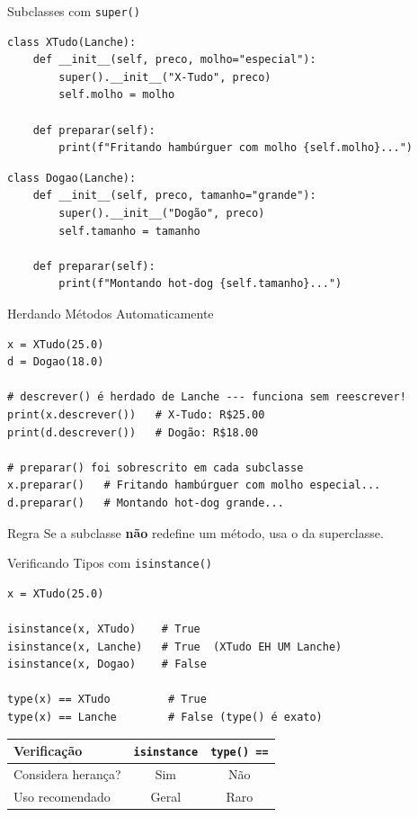 \documentclass[aspectratio=169]{beamer}
\begin{document}
\begin{frame}[fragile]{Subclasses com \texttt{super()}}
  \begin{lstlisting}
class XTudo(Lanche):
    def __init__(self, preco, molho="especial"):
        super().__init__("X-Tudo", preco)
        self.molho = molho

    def preparar(self):
        print(f"Fritando hambúrguer com molho {self.molho}...")
  \end{lstlisting}

  \begin{lstlisting}
class Dogao(Lanche):
    def __init__(self, preco, tamanho="grande"):
        super().__init__("Dogão", preco)
        self.tamanho = tamanho

    def preparar(self):
        print(f"Montando hot-dog {self.tamanho}...")
  \end{lstlisting}
\end{frame}

\begin{frame}[fragile]{Herdando Métodos Automaticamente}
  \begin{lstlisting}
x = XTudo(25.0)
d = Dogao(18.0)

# descrever() é herdado de Lanche --- funciona sem reescrever!
print(x.descrever())   # X-Tudo: R$25.00
print(d.descrever())   # Dogão: R$18.00

# preparar() foi sobrescrito em cada subclasse
x.preparar()   # Fritando hambúrguer com molho especial...
d.preparar()   # Montando hot-dog grande...
  \end{lstlisting}

  \begin{exampleblock}{Regra}
    Se a subclasse \textbf{não} redefine um método, usa o da superclasse.
  \end{exampleblock}
\end{frame}

\begin{frame}[fragile]{Verificando Tipos com \texttt{isinstance()}}
  \begin{lstlisting}
x = XTudo(25.0)

isinstance(x, XTudo)    # True
isinstance(x, Lanche)   # True  (XTudo EH UM Lanche)
isinstance(x, Dogao)    # False

type(x) == XTudo         # True
type(x) == Lanche        # False (type() é exato)
  \end{lstlisting}

  \bigskip

  \begin{center}
    \begin{tabular}{lcc}
      \toprule
      \textbf{Verificação} & \textbf{\texttt{isinstance}} & \textbf{\texttt{type() ==}} \\
      \midrule
      Considera herança? & Sim & Não \\
      Uso recomendado    & Geral & Raro \\
      \bottomrule
    \end{tabular}
  \end{center}
\end{frame}
\end{document}
